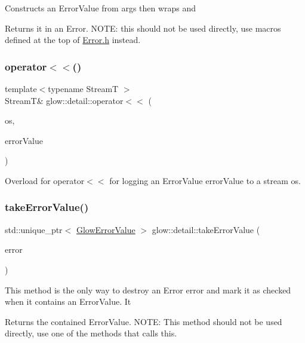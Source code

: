 Constructs an Error\+Value from {\ttfamily args} then wraps and \begin{DoxyReturn}{Returns}
it in an Error. N\+O\+TE\+: this should not be used directly, use macros defined at the top of \hyperlink{_error_8h_source}{Error.\+h} instead. 
\end{DoxyReturn}
\mbox{\label{namespaceglow_1_1detail_a523e3184bbccd0f375f59b695812f382}} 
\subsubsection{\texorpdfstring{operator$<$$<$()}{operator<<()}}
{\footnotesize\ttfamily template$<$typename StreamT $>$ \\
StreamT\& glow\+::detail\+::operator$<$$<$ (\begin{DoxyParamCaption}\item[{StreamT \&}]{os,  }\item[{const \hyperlink{classglow_1_1detail_1_1_glow_error_value}{Glow\+Error\+Value} \&}]{error\+Value }\end{DoxyParamCaption})}

Overload for operator$<$$<$ for logging an Error\+Value {\ttfamily error\+Value} to a stream {\ttfamily os}. \mbox{\label{namespaceglow_1_1detail_a9da81cdf40a87d71d6a6d3937cad18a6}} 
\subsubsection{\texorpdfstring{take\+Error\+Value()}{takeErrorValue()}}
{\footnotesize\ttfamily std\+::unique\+\_\+ptr$<$ \hyperlink{classglow_1_1detail_1_1_glow_error_value}{Glow\+Error\+Value} $>$ glow\+::detail\+::take\+Error\+Value (\begin{DoxyParamCaption}\item[{\hyperlink{classglow_1_1detail_1_1_glow_error}{Glow\+Error}}]{error }\end{DoxyParamCaption})}

This method is the only way to destroy an Error {\ttfamily error} and mark it as checked when it contains an Error\+Value. It \begin{DoxyReturn}{Returns}
the contained Error\+Value. N\+O\+TE\+: This method should not be used directly, use one of the methods that calls this. 
\end{DoxyReturn}
